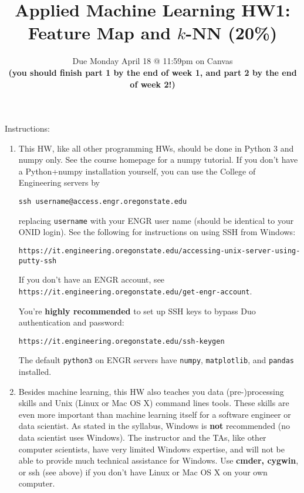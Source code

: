 \documentclass[11pt]{article}
\title{\vspace{-1cm}Applied Machine Learning HW1: Feature Map and $k$-NN (20\%)}
\author{Due {Monday April 18} @ 11:59pm on Canvas\\[0.1cm]
{\bf \color{black}(you should finish part 1 by the end of week 1, and part 2 by the end of week 2!)}}
\date{}
\newcommand{\update}[1]{{\bf\color{black} #1}}
\begin{document}
\maketitle

\setdefaultleftmargin{15pt}{}{}{}{}{}

\vspace{-.5cm}
\noindent Instructions:
\begin{enumerate}
\item This HW, like all other programming HWs, should be done in Python 3 and numpy only.
See the course homepage for a numpy tutorial.
If you don't have a Python+numpy installation yourself, you can use the  College of Engineering servers by

\verb|ssh username@access.engr.oregonstate.edu|

replacing \verb|username| with your ENGR user name (should be identical to your ONID login). See the following for instructions on using SSH from Windows:

\verb|https://it.engineering.oregonstate.edu/accessing-unix-server-using-putty-ssh|

 If you don't have an ENGR account,
see {\tt https://it.engineering.oregonstate.edu/get-engr-account}.

\smallskip

You're {\bf highly recommended} to set up SSH keys to bypass Duo authentication and password:

{\tt https://it.engineering.oregonstate.edu/ssh-keygen}

The default {\tt python3} on ENGR servers have {\tt numpy}, {\tt matplotlib}, and {\tt pandas} installed. 

\item Besides machine learning, this HW also teaches you data (pre-)processing skills and Unix (Linux or Mac OS X) command lines tools. These skills are even more important than machine learning itself for a software engineer or data scientist. As stated in the syllabus, Windows is {\bf not} recommended (no data scientist uses Windows). The instructor and the TAs, like other computer scientists, have very limited Windows expertise, and will not be able to provide much technical assistance for Windows. Use \update{cmder, cygwin}, or ssh (see above) if you don't have Linux or Mac OS X on your own computer.


\end{enumerate}
\end{document}
